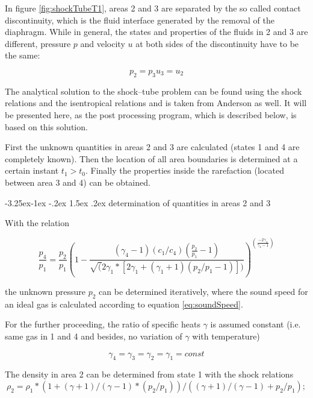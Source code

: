\documentclass{report}
\makeatletter
\renewcommand\paragraph{\@startsection{paragraph}{4}{\z@}%
  {-3.25ex\@plus -1ex \@minus -.2ex}%
  {1.5ex \@plus .2ex}%
  {\normalfont\normalsize\bfseries}}
\makeatother
\begin{document}
In figure \ref{fig:shockTubeT1}, areas 2 and 3 are separated by the so called contact discontinuity, which is the fluid interface generated by the removal of the diaphragm. While in general, the states and properties of the fluids in 2 and 3 are different, pressure $p$ and velocity $u$ at both sides of the discontinuity have to be the same:

\begin{equation}
\label{eq:condCD}
p_2=p_3
u_3=u_2
\end{equation}

The analytical solution to the shock--tube problem can be found using the shock relations and the isentropical relations and is taken from Anderson \cite{Anderson2002} as well. 
It will be presented here, as the post processing program, which is described below, is based on this solution.

First the unknown quantities in areas 2 and 3 are calculated (states 1 and 4 are completely known). Then the location of all area boundaries is determined at a certain instant $t_1>t_0$. Finally the properties inside the rarefaction (located between area 3 and 4) can be obtained.

\paragraph{determination of quantities in areas 2 and 3}

With the relation

\begin{equation}
 \frac{p_4}{p_1}=\frac{p_2}{p_1}(1-\frac{(\gamma_4-1)(c_1/c_4)(\frac{p_2}{p_1}-1)}{\sqrt(2\gamma_1*[2 \gamma_1+(\gamma_1+1)(p_2/p_1-1)])})^(\frac{-2 \gamma_4}{\gamma_4-1})
\end{equation}

 the unknown pressure $p_2$ can be determined iteratively, where the sound speed for an ideal gas is calculated according to equation \ref{eq:soundSpeed}. 

For the further proceeding, the ratio of specific heats $\gamma$ is assumed constant (i.e. same gas in 1 and 4 and besides, no variation of $\gamma$ with temperature)

\begin{equation}
 \gamma_4= \gamma_3= \gamma_2= \gamma_1=const
\end{equation}

The density in area 2 can be determined from state 1 with the shock relations 
\begin{equation}
 \rho_2=\rho_1*(1+(\gamma+1)/(\gamma-1)*(p_2/p_1))/((\gamma+1)/(\gamma-1)+p_2/p_1);
\end{equation}
\end{document}
